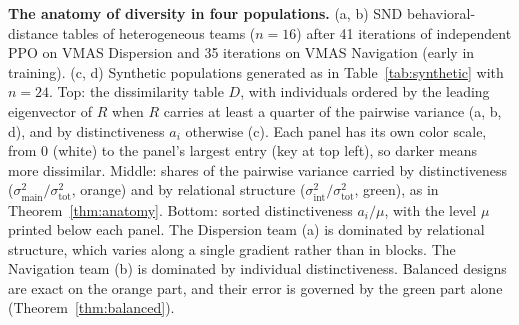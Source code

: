 \caption{\textbf{The anatomy of diversity in four populations.} (a, b) SND
behavioral-distance tables of heterogeneous teams ($n=16$) after 41 iterations of independent PPO on VMAS Dispersion
and 35 iterations on VMAS Navigation (early in training). (c, d) Synthetic
populations generated as in Table~\ref{tab:synthetic} with $n=24$. Top: the dissimilarity table $D$, with individuals ordered by the leading eigenvector of $R$ when $R$ carries at least a quarter of the pairwise variance (a, b, d), and by distinctiveness $a_i$ otherwise (c). Each panel has its own color scale, from $0$ (white) to the panel's largest
entry (key at top left), so darker means more dissimilar. Middle: shares of the pairwise variance carried by
distinctiveness ($\sigma^2_{\mathrm{main}}/\sigma^2_{\mathrm{tot}}$, orange) and by
relational structure ($\sigma^2_{\mathrm{int}}/\sigma^2_{\mathrm{tot}}$, green), as
in Theorem~\ref{thm:anatomy}. Bottom: sorted distinctiveness $a_i/\mu$, with the level $\mu$ printed below each panel. The Dispersion
team (a) is dominated by relational structure, which varies along a single gradient rather than in blocks. The Navigation team (b) is dominated by individual distinctiveness.
Balanced designs are exact on the orange part, and their error is governed by the
green part alone (Theorem~\ref{thm:balanced}).}
\label{fig:gallery}

